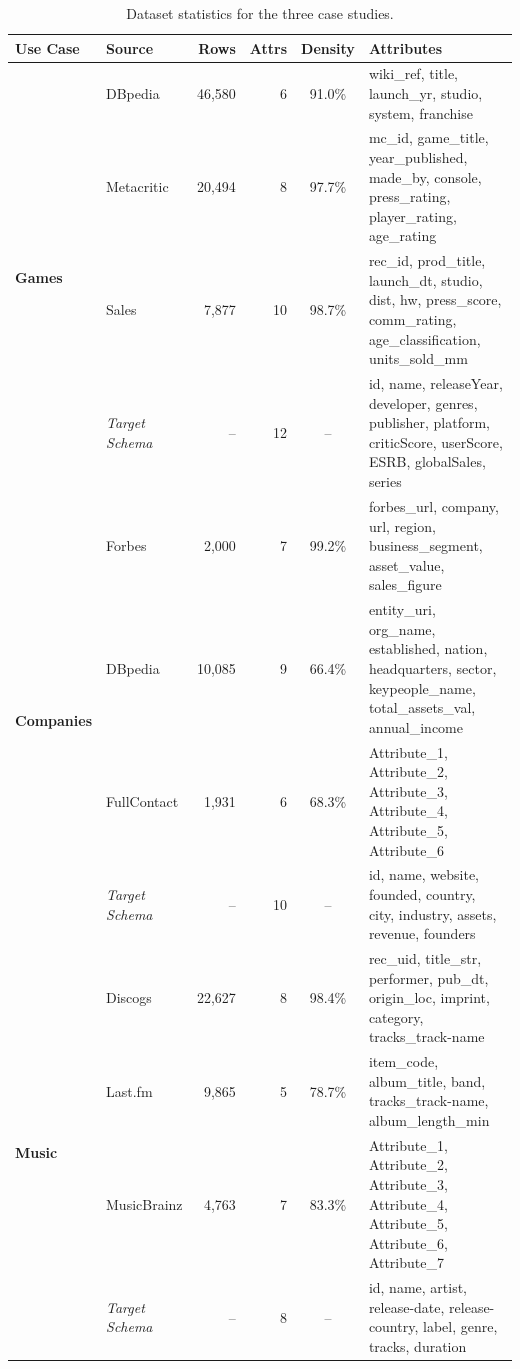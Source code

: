 
\begin{table}[t]
\caption{Dataset statistics for the three case studies.}
\label{tab:dataset_statistics}
\centering
\small
\begin{tabular}{llrrcp{9.5cm}}
\toprule
\textbf{Use Case} & \textbf{Source} & \textbf{Rows} & \textbf{Attrs} & \textbf{Density} & \textbf{Attributes} \\
\midrule
\multirow{4}{*}{\textbf{Games}}
 & DBpedia & 46,580 & 6 & 91.0\% & wiki\_ref, title, launch\_yr, studio, system, franchise \\
 & Metacritic & 20,494 & 8 & 97.7\% & mc\_id, game\_title, year\_published, made\_by, console, press\_rating, player\_rating, age\_rating \\
 & Sales & 7,877 & 10 & 98.7\% & rec\_id, prod\_title, launch\_dt, studio, dist, hw, press\_score, comm\_rating, age\_classification, units\_sold\_mm \\
\cmidrule{2-6}
 & \textit{Target Schema} & -- & 12 & -- & id, name, releaseYear, developer, genres, publisher, platform, criticScore, userScore, ESRB, globalSales, series \\
\midrule
\multirow{4}{*}{\textbf{Companies}}
 & Forbes & 2,000 & 7 & 99.2\% & forbes\_url, company, url, region, business\_segment, asset\_value, sales\_figure \\
 & DBpedia & 10,085 & 9 & 66.4\% & entity\_uri, org\_name, established, nation, headquarters, sector, keypeople\_name, total\_assets\_val, annual\_income \\
 & FullContact & 1,931 & 6 & 68.3\% & Attribute\_1, Attribute\_2, Attribute\_3, Attribute\_4, Attribute\_5, Attribute\_6 \\
\cmidrule{2-6}
 & \textit{Target Schema} & -- & 10 & -- & id, name, website, founded, country, city, industry, assets, revenue, founders \\
\midrule
\multirow{4}{*}{\textbf{Music}}
 & Discogs & 22,627 & 8 & 98.4\% & rec\_uid, title\_str, performer, pub\_dt, origin\_loc, imprint, category, tracks\_track-name \\
 & Last.fm & 9,865 & 5 & 78.7\% & item\_code, album\_title, band, tracks\_track-name, album\_length\_min \\
 & MusicBrainz & 4,763 & 7 & 83.3\% & Attribute\_1, Attribute\_2, Attribute\_3, Attribute\_4, Attribute\_5, Attribute\_6, Attribute\_7 \\
\cmidrule{2-6}
 & \textit{Target Schema} & -- & 8 & -- & id, name, artist, release-date, release-country, label, genre, tracks, duration \\
\bottomrule
\end{tabular}
\end{table}
